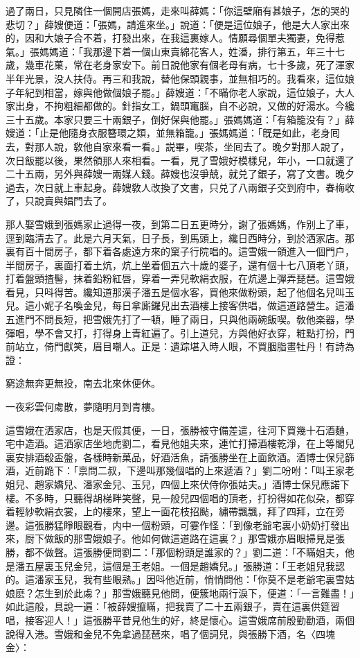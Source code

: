 過了兩日，只見隣住一個開店張媽，走來叫薛媽：「你這壁廂有甚娘子，怎的哭的悲切？」薛嫂便道：「張媽，請進來坐。」說道：「便是這位娘子，他是大人家出來的，因和大娘子合不着，打發出來，在我這裏嫁人。情願尋個單夫獨妻，免得惹氣。」張媽媽道：「我那邊下着一個山東賣綿花客人，姓潘，排行第五，年三十七歲，幾車花菓，常在老身家安下。前日說他家有個老母有病，七十多歲，死了渾家半年光景，没人扶侍。再三和我說，替他保頭親事，並無相巧的。我看來，這位娘子年紀到相當，嫁與他做個娘子罷。」薛嫂道：「不瞞你老人家說，這位娘子，大人家出身，不拘粗細都做的。針指女工，鍋頭竃腦，自不必說，又做的好湯水。今纔三十五歲。本家只要三十兩銀子，倒好保與他罷。」張媽媽道：「有箱籠没有？」薛嫂道：「止是他隨身衣服簪環之類，並無箱籠。」張媽媽道：「旣是如此，老身囘去，對那人說，敎他自家來看一看。」説畢，喫茶，坐囘去了。晚夕對那人說了，次日飯罷以後，果然領那人來相看。一看，見了雪娥好模樣兒，年小，一口就還了二十五兩，另外與薛嫂一兩媒人錢。薛嫂也沒爭兢，就兑了銀子，寫了文書。晚夕過去，次日就上車起身。薛嫂敎人改換了文書，只兑了八兩銀子交到府中，春梅收了，只說賣與娼門去了。

那人娶雪娥到張媽家止過得一夜，到第二日五更時分，謝了張媽媽，作别上了車，逕到臨清去了。此是六月天氣，日子長，到馬頭上，纔日西時分，到於洒家店。那裏有百十間房子，都下着各處遠方來的窠子行院唱的。這雪娥一領進入一個門户，半間房子，裏面打着土炕，炕上坐着個五六十歲的婆子，還有個十七八頂老丫頭，打着盤頭揸髻，抹着鉛粉紅唇，穿着一弄兒軟絹衣服，在炕邊上彈弄琵琶。這雪娥看見，只呌得苦。纔知道那漢子潘五是個水客，買他來做粉頭，起了他個名兒叫玉兒。這小妮子名喚金兒，每日拿廝鑼兒出去酒樓上接客供唱，做這道路營生。這潘五進門不問長短，把雪娥先打了一頓，睡了兩日，只與他兩碗飯喫。敎他楽器，學彈唱，學不會又打，打得身上青紅遍了。引上道兒，方與他好衣穿，粧點打扮，門前站立，倚門獻笑，眉目嘲人。正是：遺踪堪入時人眼，不買胭脂畫牡丹！有詩為證：

窮途無奔更無投，南去北來休便休。

一夜彩雲何䖏散，夢隨明月到青樓。

這雪娥在洒家店，也是天假其便，一日，張勝被守備差遣，往河下買幾十石酒麯，宅中造酒。這洒家店坐地虎劉二，看見他姐夫來，連忙打掃酒樓乾淨，在上等閣兒裏安排酒殽盃盤，各樣時新菓品，好酒活魚，請張勝坐在上面飲酒。酒博士保兒篩酒，近前跪下：「禀問二叔，下邊叫那幾個唱的上來遞酒？」劉二吩咐：「叫王家老姐兒、趙家嬌兒、潘家金兒、玉兒，四個上來伏侍你張姑夫。」酒博士保兒應諾下樓。不多時，只聽得胡梯畔笑聲，見一般兒四個唱的頂老，打扮得如花似朶，都穿着輕紗軟絹衣裳，上的樓來，望上一面花枝招颭，繡帶飄飄，拜了四拜，立在旁邊。這張勝猛睜眼觀看，内中一個粉頭，可霎作怪：「到像老爺宅裏小奶奶打發出來，厨下做飯的那雪娥娘子。他如何做這道路在這裏？」那雪娥亦眉眼掃見是張勝，都不做聲。這張勝便問劉二：「那個粉頭是誰家的？」劉二道：「不瞞姐夫，他是潘五屋裏玉兒金兒，這個是王老姐。一個是趙嬌兒。」張勝道：「王老姐兒我認的。這潘家玉兒，我有些眼熟。」因呌他近前，悄悄問他：「你莫不是老爺宅裏雪姑娘麽？怎生到於此䖏？」那雪娥聽見他問，便簇地兩行淚下，便道：「一言難盡！」如此這般，具說一遍：「被薛嫂攛瞞，把我賣了二十五兩銀子，賣在這裏供筵習唱，接客迎人！」這張勝平昔見他生的好，終是懷心。這雪娥席前殷勤勸酒，兩個說得入港。雪娥和金兒不免拿過琵琶來，唱了個詞兒，與張勝下酒，名〈四塊金〉：

